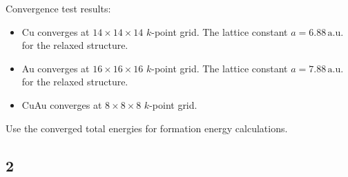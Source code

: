 \documentclass[12pt]{article}
\newcommand{\unit}[1]{\ensuremath{\, \mathrm{#1}}}
\begin{document}
\begin{figure}[h]
\begin{center}
	\quad
\end{center}
\end{figure}

Convergence test results:
\begin{itemize}
	\item Cu converges at $14\times14\times14$ $k$-point grid. The lattice constant $a = 6.88\unit{a.u.}$ for the relaxed structure. 
	\item Au converges at $16\times16\times16$ $k$-point grid. The lattice constant $a = 7.88\unit{a.u.}$ for the relaxed structure. 
	\item CuAu converges at $8\times8\times8$ $k$-point grid.
\end{itemize}

Use the converged total energies for formation energy calculations. 

\subsection*{2}
\end{document}
